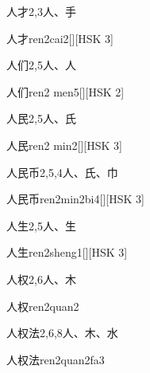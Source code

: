 \begin{entry}{人才}{2,3}{⼈、⼿}
  \begin{phonetics}{人才}{ren2cai2}[][HSK 3]
  \end{phonetics}
\end{entry}

\begin{entry}{人们}{2,5}{⼈、⼈}
  \begin{phonetics}{人们}{ren2 men5}[][HSK 2]
  \end{phonetics}
\end{entry}

\begin{entry}{人民}{2,5}{⼈、⽒}
  \begin{phonetics}{人民}{ren2 min2}[][HSK 3]
  \end{phonetics}
\end{entry}

\begin{entry}{人民币}{2,5,4}{⼈、⽒、⼱}
  \begin{phonetics}{人民币}{ren2min2bi4}[][HSK 3]
  \end{phonetics}
\end{entry}

\begin{entry}{人生}{2,5}{⼈、⽣}
  \begin{phonetics}{人生}{ren2sheng1}[][HSK 3]
  \end{phonetics}
\end{entry}

\begin{entry}{人权}{2,6}{⼈、⽊}
  \begin{phonetics}{人权}{ren2quan2}
  \end{phonetics}
\end{entry}

\begin{entry}{人权法}{2,6,8}{⼈、⽊、⽔}
  \begin{phonetics}{人权法}{ren2quan2fa3}
  \end{phonetics}
\end{entry}

